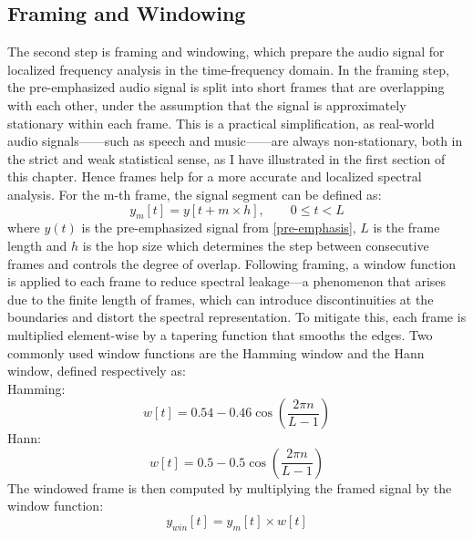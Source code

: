 \subsection{Framing and Windowing} \label{subsec:framingwindowing}
The second step is framing and windowing, which prepare the audio signal for localized frequency analysis in the time-frequency domain. In the framing step, the pre-emphasized audio signal is split into short frames that are overlapping with each other, under the assumption that the signal is approximately stationary within each frame. This is a practical simplification, as real-world audio signals——such as speech and music——are always non-stationary, both in the strict and weak statistical sense, as I have illustrated in the first section of this chapter. Hence frames help for a more accurate and localized spectral analysis. For the m-th frame, the signal segment can be defined as:\\
\begin{equation}
y_m[t]=y[t+m\times h], \qquad 0\leq t<L \label{framing}
\end{equation}
where $y(t)$ is the pre-emphasized signal from \eqref{pre-emphasis}, $L$ is the frame length and $h$ is the hop size which determines the step between consecutive frames and controls the degree of overlap.
Following framing, a window function is applied to each frame to reduce spectral leakage—a phenomenon that arises due to the finite length of frames, which can introduce discontinuities at the boundaries and distort the spectral representation. To mitigate this, each frame is multiplied element-wise by a tapering function that smooths the edges. Two commonly used window functions are the Hamming window and the Hann window, defined respectively as:\\
  Hamming:
  \begin{equation}
  w[t]=0.54-0.46\cos(\frac{2\pi n}{L-1}) \label{Hamming}
  \end{equation}
  Hann:
  \begin{equation}
  w[t]=0.5-0.5\cos(\frac{2\pi n}{L-1}) \label{Hann}
  \end{equation}
The windowed frame is then computed by multiplying the framed signal by the window function:\\
\begin{equation}
	y_{win}[t]=y_m[t]\times w[t] \label{windowing}
\end{equation}
